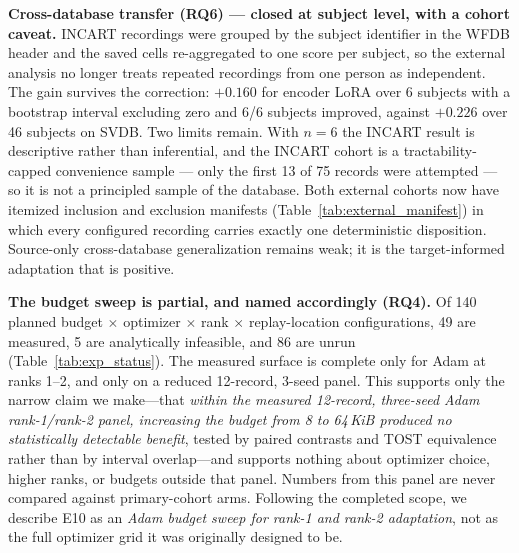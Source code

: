 \textbf{Cross-database transfer (RQ6) --- closed at subject level, with a
cohort caveat.} INCART recordings were grouped by the subject identifier in the
WFDB header and the saved cells re-aggregated to one score per subject, so the
external analysis no longer treats repeated recordings from one person as
independent. The gain survives the correction: $+0.160$ \macrof{} for encoder
LoRA over 6 subjects with a bootstrap interval excluding zero and 6/6 subjects
improved, against $+0.226$ over 46 subjects on SVDB. Two limits remain. With
$n = 6$ the INCART result is descriptive rather than inferential, and the INCART
cohort is a tractability-capped convenience sample --- only the first 13 of 75
records were attempted --- so it is not a principled sample of the database. Both
external cohorts now have itemized inclusion and exclusion manifests
(Table~\ref{tab:external_manifest}) in which every configured recording carries
exactly one deterministic disposition. Source-only cross-database generalization
remains weak; it is the target-informed adaptation that is positive.

\textbf{The budget sweep is partial, and named accordingly (RQ4).} Of 140 planned budget $\times$
optimizer $\times$ rank $\times$ replay-location configurations, 49 are measured,
5 are analytically infeasible, and 86 are unrun (Table~\ref{tab:exp_status}). The measured surface is complete
only for Adam at ranks 1--2, and only on a reduced 12-record, 3-seed panel. This
supports only the narrow claim we make---that \emph{within the measured
12-record, three-seed Adam rank-1/rank-2 panel, increasing the budget from 8 to
64\,KiB produced no statistically detectable benefit}, tested by paired contrasts
and TOST equivalence rather than by interval overlap---and supports nothing about
optimizer choice, higher ranks, or budgets outside that panel. Numbers from
this panel are never compared against primary-cohort arms. Following the
completed scope, we describe E10 as an \emph{Adam budget sweep for rank-1 and
rank-2 adaptation}, not as the full optimizer grid it was originally designed
to be.

